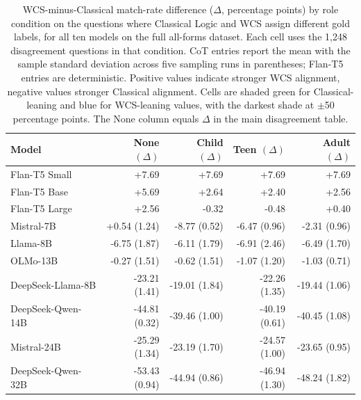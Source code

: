 \begin{table}[H]
\centering
\caption{WCS-minus-Classical match-rate difference ($\Delta$, percentage points) by role condition on the questions where Classical Logic and WCS assign different gold labels, for all ten models on the full all-forms dataset. Each cell uses the 1,248 disagreement questions in that condition. CoT entries report the mean with the sample standard deviation across five sampling runs in parentheses; Flan-T5 entries are deterministic. Positive values indicate stronger WCS alignment, negative values stronger Classical alignment. Cells are shaded green for Classical-leaning and blue for WCS-leaning values, with the darkest shade at $\pm$50 percentage points. The None column equals $\Delta$ in the main disagreement table.}
\label{tab:role-disagreement-delta-final2}
\begin{tabular}{lrrrr}
\toprule
Model & None $(\Delta)$ & Child $(\Delta)$ & Teen $(\Delta)$ & Adult $(\Delta)$ \\
\midrule
Flan-T5 Small & \cellcolor[HTML]{DEE1E4}+7.69 & \cellcolor[HTML]{DEE1E4}+7.69 & \cellcolor[HTML]{DEE1E4}+7.69 & \cellcolor[HTML]{DEE1E4}+7.69 \\
Flan-T5 Base & \cellcolor[HTML]{E4E5E6}+5.69 & \cellcolor[HTML]{EBEBEA}+2.64 & \cellcolor[HTML]{ECECEA}+2.40 & \cellcolor[HTML]{EBECEA}+2.56 \\
Flan-T5 Large & \cellcolor[HTML]{EBECEA}+2.56 & \cellcolor[HTML]{F1F0EC}-0.32 & \cellcolor[HTML]{F1F0EC}-0.48 & \cellcolor[HTML]{F1F0ED}+0.40 \\
Mistral-7B & \cellcolor[HTML]{F1F0EC}+0.54 (1.24) & \cellcolor[HTML]{DCE2D9}-8.77 (0.52) & \cellcolor[HTML]{E2E6DE}-6.47 (0.96) & \cellcolor[HTML]{ECEDE8}-2.31 (0.96) \\
Llama-8B & \cellcolor[HTML]{E1E6DE}-6.75 (1.87) & \cellcolor[HTML]{E2E7DF}-6.11 (1.79) & \cellcolor[HTML]{E0E5DD}-6.91 (2.46) & \cellcolor[HTML]{E1E6DE}-6.49 (1.70) \\
OLMo-13B & \cellcolor[HTML]{F1F1EC}-0.27 (1.51) & \cellcolor[HTML]{F0F0EC}-0.62 (1.51) & \cellcolor[HTML]{EFEFEB}-1.07 (1.20) & \cellcolor[HTML]{EFEFEB}-1.03 (0.71) \\
DeepSeek-Llama-8B & \cellcolor[HTML]{B7CAB8}-23.21 (1.41) & \cellcolor[HTML]{C2D1C2}-19.01 (1.84) & \cellcolor[HTML]{B9CBBB}-22.26 (1.35) & \cellcolor[HTML]{C0D0C1}-19.44 (1.06) \\
DeepSeek-Qwen-14B & \cellcolor[HTML]{80A587}-44.81 (0.32) & \cellcolor[HTML]{8DAE94}-39.46 (1.00) & \cellcolor[HTML]{8CAD92}-40.19 (0.61) & \cellcolor[HTML]{8BAC91}-40.45 (1.08) \\
Mistral-24B & \cellcolor[HTML]{B2C6B4}-25.29 (1.34) & \cellcolor[HTML]{B7CAB8}-23.19 (1.70) & \cellcolor[HTML]{B3C7B5}-24.57 (1.00) & \cellcolor[HTML]{B6C9B7}-23.65 (0.95) \\
DeepSeek-Qwen-32B & \cellcolor[HTML]{739C7C}-53.43 (0.94) & \cellcolor[HTML]{80A587}-44.94 (0.86) & \cellcolor[HTML]{7AA183}-46.94 (1.30) & \cellcolor[HTML]{779F80}-48.24 (1.82) \\
\bottomrule
\end{tabular}
\end{table}
